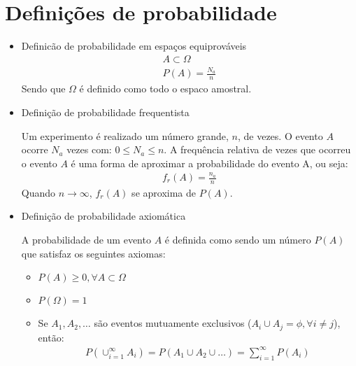 \documentclass[11pt,a4paper]{article}
\begin{document}
\section{Definições de probabilidade}
\begin{itemize}
  \item Definicão de probabilidade em espaços equiprováveis
    \begin{align}
      A \subset \Omega\\
      P(A)= \frac{N_a}{n}
    \end{align}
    Sendo que $\Omega$ é definido como todo o espaco amostral.
  \item Definição de probabilidade frequentista

    Um experimento é realizado um número grande, $n$, de vezes. O evento $A$ ocorre $N_a$ vezes com: $0 \le N_a \le n$. A frequência relativa de vezes que ocorreu o evento $A$ é uma forma de aproximar a probabilidade do evento A, ou seja:
    \begin{align}
      f_r (A)= \frac{n_a}{n}
    \end{align}
    Quando $n \to \infty$, $f_r(A)$ se aproxima de $P(A)$.
  \item Definição de probabilidade axiomática

    A probabilidade de um evento $A$ é definida como sendo um número $P(A)$ que satisfaz
    os seguintes axiomas:
    \begin{itemize}
      \item $P(A) \ge 0, \forall A \subset \Omega$
      \item $P(\Omega)=1$
      \item Se $A_1, A_2,\ldots$ são eventos mutuamente exclusivos ($A_i \cup A_j = \phi, \forall i \neq j$), então:
        \begin{align}
          P(\cup^\infty_{i=1} A_i)= P(A_1\cup A_2 \cup \ldots)= \sum^\infty_{i=1} P(A_i) 
        \end{align}
    \end{itemize}
\end{itemize}
\end{document}
